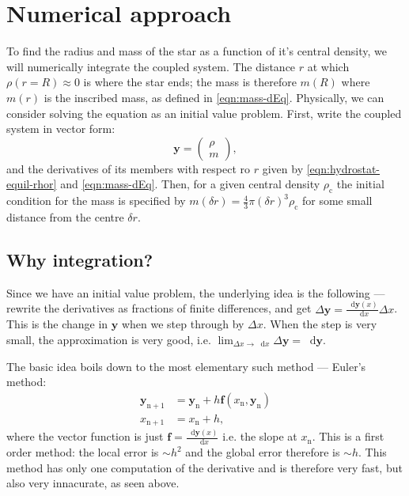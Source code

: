 \documentclass[]{article}
\newcommand{\dd}{\mathop{}\!\mathrm{d}}
\renewcommand{\vec}[1]{\boldsymbol{#1}}
\begin{document}
\section{Numerical approach}
To find the radius and mass of the star as a function of it's central density, we will numerically integrate the coupled system. The distance $r$ at which $\rho (r=R) \approx 0$ is where the star ends; the mass is therefore $m(R)$ where $m(r)$ is the inscribed mass, as defined in \eqref{eqn:mass-dEq}. Physically, we can consider solving the equation as an initial value problem. First, write the coupled system in vector form:
\begin{equation}
	\vec{y} = \begin{pmatrix}
		\rho \\
		m
	\end{pmatrix},
\end{equation}
and the derivatives of its members with respect ro $r$ given by \eqref{eqn:hydrostat-equil-rhor} and \eqref{eqn:mass-dEq}. Then, for a given central density $\rho_\mathrm{c}$ the initial condition for the mass is specified by $m(\delta r) = \frac{4}{3} \pi (\delta r)^3 \rho_\mathrm{c}$ for some small distance from the centre $\delta r$.
\subsection{Why integration?}
Since we have an initial value problem, the underlying idea is the following --- rewrite the derivatives as fractions of finite differences, and get $\Delta \vec{y} = \frac{\dd \vec{y}(x)}{\dd x} \Delta x$. This is the change in $\vec{y}$ when we step through by $\Delta x$. When the step is very small, the approximation is very good, i.e. $\lim_{\Delta x \rightarrow \dd x} \Delta \vec{y} = \dd \vec{y}$.

The basic idea boils down to the most elementary such method --- Euler's method:
\begin{align}
	\vec{y}_\mathrm{n+1} &= \vec{y}_\mathrm{n} + h \vec{f}(x_\mathrm{n}, \vec{y}_\mathrm{n})\\
	x_\mathrm{n+1} &= x_\mathrm{n} + h, \nonumber
\end{align}
where the vector function is just $\vec{f} = \frac{\dd \vec{y}(x)}{\dd x}$ i.e. the slope at $x_\mathrm{n}$. This is a first order method: the local error is $\sim h^2$ and the global error therefore is $\sim h$. This method has only one computation of the derivative and is therefore very fast, but also very innacurate, as seen above.
\end{document}
